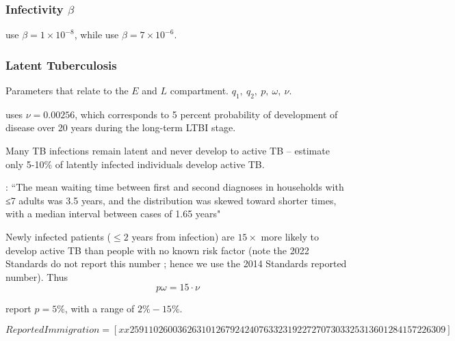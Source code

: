\documentclass[sn-mathphys,Numbered]{sn-jnl}%
\theoremstyle{thmstyleone}%
\theoremstyle{thmstyletwo}%
\theoremstyle{thmstylethree}%
\begin{document}
\subsubsection{Infectivity $\beta$}

 \cite{Guo2011PersistentLatency} use $\beta=1\times 10^{-8}$, while \cite{Ziv2001EarlyInfection} use $\beta=7\times 10^{-6}$.

\subsubsection{Latent Tuberculosis}

Parameters that relate to the $E$ and $L$ compartment.  $q_1,~q_2,~p,~\omega,~\nu$.  



\cite{Ziv2001EarlyInfection} uses $\nu = 0.00256$, which corresponds to 5 percent probability of development of disease over 20 years during the long-term LTBI stage.  




Many TB infections remain latent and never develop to active TB -- \cite{Khajanchi2018DynamicsReactivation} estimate only 5-10\% of latently infected individuals develop active TB.  

\cite{Brooks-Pollock2011}: ``The mean waiting time between first and second diagnoses in households with ≤7 adults was 3.5 years, and the distribution was skewed toward shorter times, with a median interval between cases of 1.65 years" 

Newly infected patients ($\leq2$ years from infection) are $15\times$ more likely to develop active TB than people with no known risk factor \cite{PublicHealthAgencyofCanada2014CanadianStandards.} (note the 2022 Standards \cite{Campbell2022ChapterInfection} do not report this number ; hence we use the 2014 Standards \cite{PublicHealthAgencyofCanada2014CanadianStandards.} reported number).  Thus $$ p\omega = 15 \cdot \nu  $$

\cite{Jacquet2006} report $p=5\%$, with a range of $2\%-15\%$.



 $$ ReportedImmigration = [x x 259110 260036 263101 267924 240763 323192 272707 303325 313601 284157 226309] $$


\end{document}
